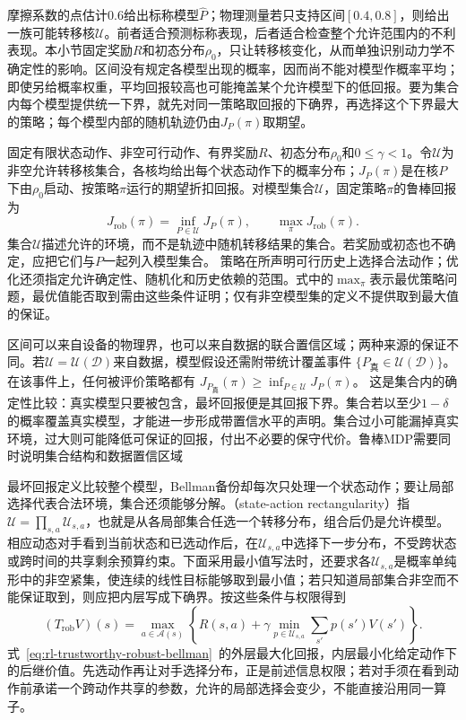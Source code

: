 摩擦系数的点估计0.6给出标称模型$\widehat P$；物理测量若只支持区间$[0.4,0.8]$，则给出一族可能转移核$\mathcal U$。前者适合预测标称表现，后者适合检查整个允许范围内的不利表现。本小节固定奖励$R$和初态分布$\rho_0$，只让转移核变化，从而单独识别动力学不确定性的影响。区间没有规定各模型出现的概率，因而尚不能对模型作概率平均；即使另给概率权重，平均回报较高也可能掩盖某个允许模型下的低回报。要为集合内每个模型提供统一下界，就先对同一策略取回报的下确界，再选择这个下界最大的策略；每个模型内部的随机轨迹仍由$J_P(\pi)$取期望。

\begin{definition}[最坏情形回报]
  \label{def:rl-trustworthy-robust-return}
  固定有限状态动作、非空可行动作、有界奖励$R$、初态分布$\rho_0$和$0\leq\gamma<1$。令$\mathcal U$为非空允许转移核集合，各核均给出每个状态动作下的概率分布；$J_P(\pi)$是在核$P$下由$\rho_0$启动、按策略$\pi$运行的期望折扣回报。对模型集合$\mathcal U$，固定策略$\pi$的鲁棒回报为
  \[
    J_{\mathrm{rob}}(\pi)=\inf_{P\in\mathcal U}J_P(\pi),
    \qquad \max_\pi J_{\mathrm{rob}}(\pi).
  \]
  集合$\mathcal U$描述允许的环境，而不是轨迹中随机转移结果的集合。若奖励或初态也不确定，应把它们与$P$一起列入模型集合。
  策略在所声明可行历史上选择合法动作；优化还须指定允许确定性、随机化和历史依赖的范围。式中的$\max_\pi$表示最优策略问题，最优值能否取到需由这些条件证明；仅有非空模型集的定义不提供取到最大值的保证。
\end{definition}

区间可以来自设备的物理界，也可以来自数据的联合置信区域；两种来源的保证不同。若$\mathcal U=\mathcal U(\mathcal D)$来自数据，模型假设还需附带统计覆盖事件
$\{P_{\text{真}}\in\mathcal U(\mathcal D)\}$。在该事件上，任何被评价策略都有
$J_{P_{\text{真}}}(\pi)\geq\inf_{P\in\mathcal U}J_P(\pi)$。
这是集合内的确定性比较：真实模型只要被包含，最坏回报便是其回报下界。集合若以至少$1-\delta$的概率覆盖真实模型，才能进一步形成带置信水平的声明。集合过小可能漏掉真实环境，过大则可能降低可保证的回报，付出不必要的保守代价。鲁棒MDP需要同时说明集合结构和数据置信区域

最坏回报定义比较整个模型，Bellman备份却每次只处理一个状态动作；要让局部选择代表合法环境，集合还须能够分解。（state-action rectangularity）指
$\mathcal U=\prod_{s,a}\mathcal U_{s,a}$，也就是从各局部集合任选一个转移分布，组合后仍是允许模型。相应动态对手看到当前状态和已选动作后，在$\mathcal U_{s,a}$中选择下一步分布，不受跨状态或跨时间的共享剩余预算约束。下面采用最小值写法时，还要求各$\mathcal U_{s,a}$是概率单纯形中的非空紧集，使连续的线性目标能够取到最小值；若只知道局部集合非空而不能保证取到，则应把内层写成下确界。按这些条件与权限得到
\begin{equation}
  (T_{\mathrm{rob}}V)(s)
    =\max_{a\in\mathcal A(s)}
      \left\{R(s,a)+\gamma
        \min_{p\in\mathcal U_{s,a}}\sum_{s'}p(s')V(s')\right\}.
  \label{eq:rl-trustworthy-robust-bellman}
\end{equation}
式~\eqref{eq:rl-trustworthy-robust-bellman}~的外层最大化回报，内层最小化给定动作下的后继价值。先选动作再让对手选择分布，正是前述信息权限；若对手须在看到动作前承诺一个跨动作共享的参数，允许的局部选择会变少，不能直接沿用同一算子。

